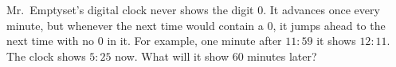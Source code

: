 Mr.\ Emptyset's digital clock never shows the digit $0$. It advances once every minute, but whenever the next time would contain a $0$, it jumps ahead to the next time with no $0$ in it. For example, one minute after $11{:}59$ it shows $12{:}11$. The clock shows $5{:}25$ now. What will it show $60$ minutes later?
